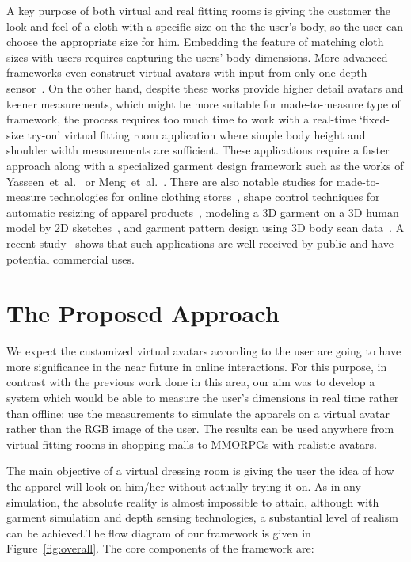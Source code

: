 \documentclass[number,preprint,review,12pt]{elsarticle}
\begin{document}
A key purpose of both virtual and real fitting rooms is giving the customer the look and feel of a cloth with a specific size on the the user's body, so the user can choose the appropriate size for him. Embedding the feature of matching cloth sizes with users requires capturing the users' body dimensions. More advanced frameworks even construct virtual avatars with input from only one depth sensor~\cite{Cui2013,Cui2010}. On the other hand, despite these works provide higher detail avatars and keener measurements, which might be more suitable for made-to-measure type of framework, the process requires too much time to work with a real-time `fixed-size try-on' virtual fitting room application where simple body height and shoulder width measurements are sufficient. These applications require a faster approach along with a specialized garment design framework such as the works of Yasseen~et~al.~\cite{Yasseen2013} or Meng~et~al.~\cite{Meng2010}. There are also notable studies for made-to-measure technologies for online clothing stores~\cite{Cordier2003}, shape control techniques for automatic resizing of apparel products~\cite{Meng2012}, modeling a 3D garment on a 3D human model by 2D sketches~\cite{Wang2003}, and garment pattern design using 3D body scan data~\cite{Kim2003}. A recent study~\cite{Kim2013} shows that such applications are well-received by public and have potential commercial uses.     

\section{The Proposed Approach}
\label{sec:Overall}
 {\color{red}We expect the customized virtual avatars according to the user are going to have more significance in the near future in online interactions. For this purpose, in contrast with the previous work done in this area, our aim was to develop a system which would be able to measure the user's dimensions in real time rather than offline; use the measurements to simulate the apparels on a virtual avatar rather than the RGB image of the user. The results can be used anywhere from virtual fitting rooms in shopping malls to MMORPGs with realistic avatars.} 
 
The main objective of a virtual dressing room is giving the user the idea of how the apparel will look on him/her without actually trying it on. As in any simulation, the absolute reality is almost impossible to attain, although with garment simulation and depth sensing technologies, a substantial level of realism can be achieved.The flow diagram of our framework is given in Figure~\ref{fig:overall}. The core components of the framework are:
\end{document}
